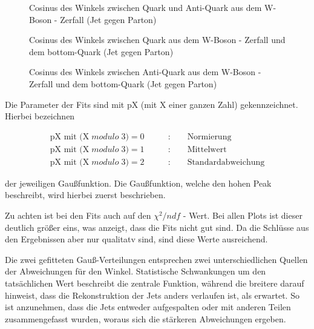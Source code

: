 \documentclass[
a4paper,                                %
twoside,                                %
BCOR1.4cm,                      %
ngerman,                                %
10pt,                           %
headings=normal,                %
headsepline,                    %
clearplainpage, %
final,                                  %
div=14,
parskip=full
]{scrbook}
\begin{document}
\begin{figure}[H]
    \caption{Cosinus des Winkels zwischen Quark und Anti-Quark aus dem W-Boson - Zerfall (Jet gegen Parton)}
    \caption{Cosinus des Winkels zwischen Quark aus dem W-Boson - Zerfall und dem bottom-Quark (Jet gegen Parton)}
    \caption{Cosinus des Winkels zwischen Anti-Quark aus dem W-Boson - Zerfall und dem bottom-Quark (Jet gegen Parton)}
\end{figure}

\newpage

Die Parameter der Fits sind mit pX (mit X einer ganzen Zahl) gekennzeichnet. Hierbei bezeichnen

\begin{align*}
	\text{pX mit (X}\;modulo\;3) = 0\qquad &:\qquad \text{Normierung}
\\
	\text{pX mit (X}\;modulo\;3) = 1\qquad &:\qquad \text{Mittelwert}
\\
	\text{pX mit (X}\;modulo\;3) = 2\qquad &:\qquad \text{Standardabweichung}
\end{align*}

der jeweiligen Gau\ss funktion. Die Gau\ss funktion, welche den hohen Peak beschreibt, wird hierbei zuerst beschrieben.

Zu achten ist bei den Fits auch auf den $\textstyle \chi^{2} / ndf $ - Wert. Bei allen Plots ist dieser deutlich gr\"o\ss er eins, was anzeigt, dass die Fits nicht gut sind. Da die Schl\"usse aus den Ergebnissen aber nur qualitatv sind, sind diese Werte ausreichend.

Die zwei gefitteten Gau\ss-Verteilungen entsprechen zwei unterschiedlichen Quellen der Abweichungen f\"ur den Winkel. Statistische Schwankungen um den tats\"achlichen Wert beschreibt die zentrale Funktion, w\"ahrend die breitere darauf hinweist, dass die Rekonstruktion der Jets anders verlaufen ist, als erwartet. So ist anzunehmen, dass die Jets entweder aufgespalten oder mit anderen Teilen zusammengefasst wurden, woraus sich die st\"arkeren Abweichungen ergeben.
\end{document}
